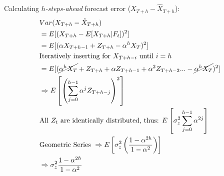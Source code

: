 \quad Calculating \textit{$h$-steps-ahead} forecast error ($X_{T+h}-\hat{X}_{T+h}$):
\begin{align*}
    & Var(X_{T+h}-\hat{X}_{T+h}) \\
    &= E[(X_{T+h} - E[X_{T+h}|F_t])^2 ] \\
    &= E[(\alpha X_{T+h-1} +Z_{T+h} - \alpha^h X_T)^2 ] \\
    &\text{Iteratively inserting for $X_{T+h-i}$ until $i=h$ }\\
    &= E[(\cancel{\alpha^h X_T} + Z_{T+h} +\alpha Z_{T+h-1} + \alpha^2 Z_{T+h-2} ... - \cancel{\alpha^h X_T} )^2 ]\\
    &\Rightarrow E\left[\left(\sum_{j=0}^{h-1} \alpha^j Z_{T+h-j} \right)^2 \right] \\
    &\text{All $Z_t$ are identically distributed, thus: } E \left[ \sigma_z^2 \sum_{j=0}^{h-1} \alpha^{2j}  \right] \\
    &\text{Geometric Series } \Rightarrow E \left[ \sigma_z^2 \left( \frac{1-\alpha^{2h}}{1-\alpha^2} \right) \right] \\
    & \Rightarrow \sigma_z^2 \frac{1-\alpha^{2h}}{1-\alpha^2}
\end{align*}

